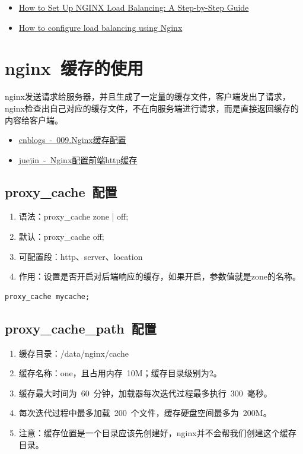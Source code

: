 \documentclass[12pt, a4paper]{article} %
\begin{document}
\begin{CJK*}{UTF8}{gbsn}
\begin{itemize}
    \item \href{https://tamerlan.dev/how-to-set-up-nginx-load-balancing-a-step-by-step-guide/}{How to Set Up NGINX Load Balancing: A Step-by-Step Guide}
    \item \href{https://upcloud.com/resources/tutorials/configure-load-balancing-nginx}{How to configure load balancing using Nginx}
\end{itemize}

\clearpage
\section{nginx~缓存的使用}
nginx发送请求给服务器，并且生成了一定量的缓存文件，客户端发出了请求，nginx检查出自己对应的缓存文件，不在向服务端进行请求，而是直接返回缓存的内容给客户端。

\begin{itemize}
    \item \href{https://www.cnblogs.com/itzgr/p/13321980.html}{cnblogs~-~009.Nginx缓存配置}
    \item  \href{https://juejin.cn/post/7079601613135937550}{juejin~-~Nginx配置前端http缓存}
\end{itemize}



\subsection{proxy\_cache~配置}

\begin{enumerate}
    \item 语法：proxy\_cache zone | off;
    \item 默认：proxy\_cache off;
    \item 可配置段：http、server、location
    \item 作用：设置是否开启对后端响应的缓存，如果开启，参数值就是zone的名称。
\end{enumerate}

\begin{lstlisting}
proxy_cache mycache;
\end{lstlisting}

\subsection{proxy\_cache\_path~配置}

\begin{enumerate}
    \item 缓存目录：/data/nginx/cache
    \item 缓存名称：one，且占用内存~10M；缓存目录级别为2。
    \item 缓存最大时间为~60~分钟，加载器每次迭代过程最多执行~300~毫秒。
    \item 每次迭代过程中最多加载~200~个文件，缓存硬盘空间最多为~200M。
    \item 注意：缓存位置是一个目录应该先创建好，nginx并不会帮我们创建这个缓存目录。
\end{enumerate}


\end{CJK*}
\end{document}
